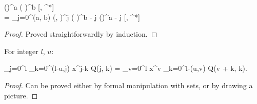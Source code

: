 \begin{lemma}
\label{lmm:transformations:swap-differential}
    \begin{eqn*}
    	\Psi(\xvec)^a \left( \frac{\delta}{\delta \Psi(\xvec)} \right)^b [\Psi, \Psi^*] \\
    	= \sum_{j=0}^{\min(a, b)}
    		 
    		\delta(\xvec, \xvec)^j
    		\left( \frac{\delta}{\delta \Psi(\xvec)} \right)^{b - j}
    		\Psi(\xvec)^{a - j}
    		[\Psi, \Psi^*]
    \end{eqn*}
\end{lemma}
\begin{proof}
Proved straightforwardly by induction.
\end{proof}

\begin{lemma}
\label{lmm:transformations:sum-rearrangement}
    For integer $l$, $u$:
    \begin{eqn*}
    	\sum_{j=0}^l \sum_{k=0}^{\min(l-u,j)} x^{j-k} Q(j, k)
    	= \sum_{v=0}^l x^v \sum_{k=0}^{l-\max(u,v)} Q(v + k, k).
    \end{eqn*}
\end{lemma}
\begin{proof}
Can be proved either by formal manipulation with sets, or by drawing a picture.
\end{proof}

